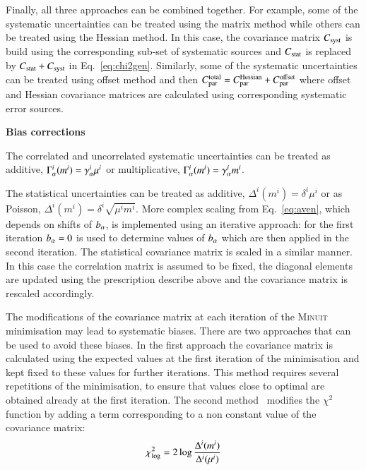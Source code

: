 \begin{description}
Finally, all three approaches can be combined together. For example, some of the systematic uncertainties
can be treated using the matrix method while others can be treated using the Hessian method. In this case, the
covariance matrix  $C_{\rm syst}$ is build using the corresponding sub-set of systematic sources and $C_{\rm stat}$ 
is replaced by $C_{\rm stat}+C_{\rm syst}$ in Eq.~\ref{eq:chi2gen}. Similarly, some of the systematic uncertainties
can be treated using offset method and then $C^{\rm total}_{ {\rm par}} = C^{\rm Hessian}_{\rm par} + C^{\rm offset}_{\rm par}$
where offset and Hessian covariance matrices are calculated using corresponding systematic error sources.

\goodbreak
\item \textbf{Bias corrections}

The correlated and uncorrelated systematic uncertainties can be treated as additive,  $\Gamma^i_\alpha(m^i) = \gamma^i_\alpha \mu^i$
or multiplicative, $\Gamma^i_\alpha(m^i) = \gamma^i_\alpha m^i$. 

The statistical uncertainties can be treated as additive, $\Delta^i(m^i) = \delta^i \mu^i$  or as Poisson,
$\Delta^i(m^i) = \delta^i \sqrt{\mu^i m^i}$. More complex scaling from Eq.~\ref{eq:aven}, 
which depends on shifts of $b_\alpha$, is implemented using an iterative approach: for the first iteration $b_\alpha =0$ 
 is used to determine values of $b_\alpha$ which are then applied in the second iteration. The statistical covariance
matrix is scaled in a similar manner. In this case the correlation matrix is assumed to be fixed, the diagonal
elements are updated using the prescription describe above and the covariance matrix is rescaled accordingly.

The modifications of the covariance matrix at each iteration of the \textsc{Minuit} minimisation may lead to systematic
biases. There are two approaches that can be used to avoid these biases. In the first approach the covariance matrix is calculated
using the expected values at the first iteration of the minimisation and kept fixed to these values for further
iterations. This method requires several repetitions of the minimisation, to ensure that values close to optimal
are obtained already at the first iteration. The second method~\cite{h1:2012kk} modifies the $\chi^2$ function by adding a term
corresponding to a non constant value of the covariance matrix:
\begin{equation}
 \chi^2_{\rm log} = 2 \log \frac{\Delta^i(m^i)}{\Delta^i(\mu^i)} 
\end{equation}  
\end{description}


